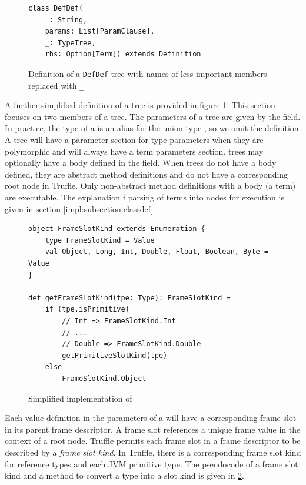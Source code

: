 \begin{figure}[!htb]
\begin{verbatim}
class DefDef(
	_: String, 
	params: List[ParamClause], 
	_: TypeTree, 
	rhs: Option[Term]) extends Definition	
\end{verbatim}
\caption{Definition of a \texttt{DefDef} tree with names of less important members replaced with \texttt{\_}}
\label{recall:defdef}
\end{figure}

A further simplified definition of a  tree is provided in figure \ref{recall:defdef}.
This section focuses on two members of a  tree.
The parameters of a  tree are given by the  field.
In practice, the type of a  is an alias for the union type , so we omit the  definition.
A  tree will have a parameter section for type parameters when they are polymorphic and will always have a term parameters section.
 trees may optionally have a body defined in the  field.
When trees do not have a body defined, they are abstract method definitions and do not have a corresponding root node in Truffle.
Only non-abstract method definitions with a body (a term) are executable.
The explanation f parsing of terms into nodes for execution is given in section \ref{impl:subsection:classdef}

\begin{figure}[!htb]
\begin{verbatim}
object FrameSlotKind extends Enumeration {
	type FrameSlotKind = Value
	val Object, Long, Int, Double, Float, Boolean, Byte = Value
}	
	
def getFrameSlotKind(tpe: Type): FrameSlotKind = 
	if (tpe.isPrimitive) 
		// Int => FrameSlotKind.Int
		// ...
		// Double => FrameSlotKind.Double
		getPrimitiveSlotKind(tpe)
	else  
		FrameSlotKind.Object
\end{verbatim}
\caption{Simplified implementation of }
\label{impl:frameslot-kind}
\end{figure}

Each value definition in the parameters of a  will have a corresponding frame slot in its parent frame descriptor. 
A frame slot references a unique frame value in the context of a root node.
Truffle permits each frame slot in a frame descriptor to be described by a \textit{frame slot kind}.
In Truffle, there is a corresponding frame slot kind for reference types and each JVM primitive type. 
The pseudocode of a frame slot kind and a method to convert a type into a slot kind is given in \ref{impl:frameslot-kind}.

